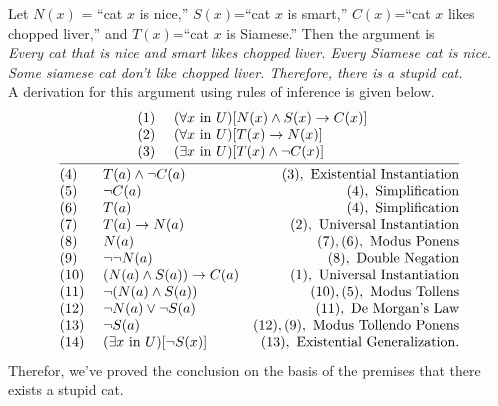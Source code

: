 \documentclass[a4paper,english,12pt]{article}
\begin{document}
\begin{exmp} Let $N(x)$ = ``cat $x$ is nice,'' $S(x)$=``cat $x$ is smart,'' $C(x)$=``cat $x$ likes chopped liver,'' and $T(x)$=``cat $x$ is Siamese.'' Then the argument is\\ 
\emph{Every cat that is nice and smart likes chopped liver. Every Siamese cat is nice. Some siamese cat don't like chopped liver. Therefore, there is a stupid cat.}\\

A derivation for this argument using rules of inference is given below.
\begin{equation}
\infer{\begin{array}
	{@{}llr@{}llr@{}llr@{}}
	(4)~&T(a)\wedge \neg C(a) & (3), \text{ Existential Instantiation}\\
	(5)~&\neg C(a)            & (4), \text{ Simplification}\\
	(6)~&T(a)                 & (4), \text{ Simplification}\\
	(7)~&T(a)\rightarrow N(a) & (2), \text{ Universal Instantiation}\\
	(8)~&N(a)                 & (7),(6), \text{ Modus Ponens}\\
	(9)~&\neg\neg N(a)        & (8), \text{ Double Negation}\\
	(10)~&(N(a)\wedge S(a))\rightarrow C(a) &(1), \text{ Universal Instantiation}\\
  (11)~&\neg(N(a)\wedge S(a))& (10),(5), \text{ Modus Tollens}\\
  (12)~&\neg N(a)\vee\neg S(a)& (11), \text{ De Morgan's Law}\\
  (13)~&\neg S(a)           & (12), (9), \text{ Modus Tollendo Ponens}\\
  (14)&(\exists x \text{ in } U)[\neg S(x)]  & (13), \text{ Existential Generalization}.
	\end{array}}
	{\begin{array}
	{@{}llr@{}llr@{}llr@{}} 
	(1)~&(\forall x \text{ in } U) [N(x)\wedge S(x) \rightarrow C(x)]&\\
	(2)~&(\forall x \text{ in } U) [T(x)\rightarrow N(x)] &\\
	(3)~&(\exists x \text{ in } U) [T(x)\wedge \neg C(x)] &
	\end{array}}
\end{equation}
Therefor, we've proved the conclusion on the basis of the premises that there exists a stupid cat.
\end{exmp}
\end{document}
